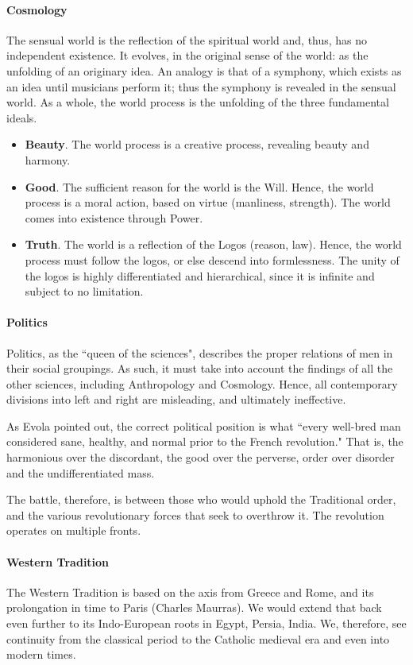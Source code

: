 \paragraph{Cosmology}
The sensual world is the reflection of the spiritual world and, thus, has no independent existence. It evolves, in the original sense of the world: as the unfolding of an originary idea. An analogy is that of a symphony, which exists as an idea until musicians perform it; thus the symphony is revealed in the sensual world. As a whole, the world process is the unfolding of the three fundamental ideals. 

\begin{itemize}
\item \textbf{Beauty}. The world process is a creative process, revealing beauty and harmony. 
\item \textbf{Good}. The sufficient reason for the world is the Will. Hence, the world process is a moral action, based on virtue (manliness, strength). The world comes into existence through Power. 
\item \textbf{Truth}. The world is a reflection of the Logos (reason, law). Hence, the world process must follow the logos, or else descend into formlessness. The unity of the logos is highly differentiated and hierarchical, since it is infinite and subject to no limitation. 
\end{itemize}
\paragraph{Politics}
Politics, as the ``queen of the sciences", describes the proper relations of men in their social groupings. As such, it must take into account the findings of all the other sciences, including Anthropology and Cosmology. Hence, all contemporary divisions into left and right are misleading, and ultimately ineffective. 

As Evola pointed out, the correct political position is what ``every well-bred man considered sane, healthy, and normal prior to the French revolution." That is, the harmonious over the discordant, the good over the perverse, order over disorder and the undifferentiated mass. 

The battle, therefore, is between those who would uphold the Traditional order, and the various revolutionary forces that seek to overthrow it. The revolution operates on multiple fronts. 

\paragraph{Western Tradition}
The Western Tradition is based on the axis from Greece and Rome, and its prolongation in time to Paris (Charles Maurras). We would extend that back even further to its Indo-European roots in Egypt, Persia, India. We, therefore, see continuity from the classical period to the Catholic medieval era and even into modern times. 


